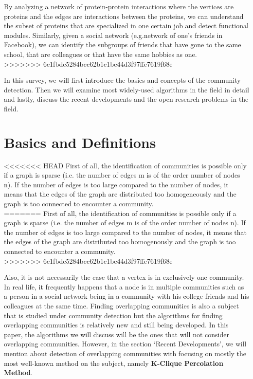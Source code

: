\documentclass[10pt]{article}
\begin{document}
By analyzing a network of protein-protein interactions where the vertices are proteins and the edges are interactions between the proteins, we can understand the subset of proteins that are specialized in one certain job\cite{protein} and detect functional modules. Similarly, given a social network (e.g.network of one’s friends in Facebook), we can identify the subgroups of friends that have gone to the same school, that are colleagues or that have the same hobbies as one. \\
>>>>>>> 6e1fbdc5284bec62b1e1be44d3f97ffe7619f68e

In this survey, we will first introduce the basics and concepts of the community detection. Then we will examine most widely-used algorithms in the field in detail and lastly, discuss the recent developments and the open research problems in the field. \\

\section{Basics and Definitions}

<<<<<<< HEAD
First of all, the identification of communities is possible only if a graph is sparse (i.e. the number of edges m is of the order number of nodes n). If the number of edges is too large compared to the number of nodes, it means that the edges of the graph are distributed too homogeneously and the graph is too connected to encounter a community\cite{fortunato}. \\
=======
First of all, the identification of communities is possible only if a graph is sparse (i.e. the number of edges m is of the order number of nodes n). If the number of edges is too large compared to the number of nodes, it means that the edges of the graph are distributed too homogenously and the graph is too connected to encounter a community\cite{fortunato}. \\
>>>>>>> 6e1fbdc5284bec62b1e1be44d3f97ffe7619f68e

Also, it is not necessarily the case that a vertex is in exclusively one community. In real life, it frequently happens that a node is in multiple communities such as a person in a social network being in a community with his college friends and his colleagues at the same time. Finding overlapping communities is also a subject that is studied under community detection but the algorithms for finding overlapping communities is relatively new and still being developed. In this paper, the algorithms we will discuss will be the ones that will not consider overlapping communities. However, in the section ‘Recent Developments’, we will mention about detection of overlapping communities with focusing on mostly the most well-known method on the subject, namely \textbf{K-Clique Percolation Method}. \\
\end{document}
